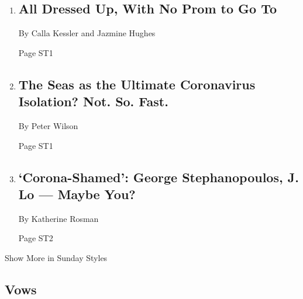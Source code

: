 \begin{enumerate}
\def\labelenumi{\arabic{enumi}.}
\item
  \href{/2020/04/17/style/prom-canceled-coronavirus.html}{}

  \hypertarget{all-dressed-up-with-no-prom-to-go-to-1}{%
  \subsection{All Dressed Up, With No Prom to Go
  To}\label{all-dressed-up-with-no-prom-to-go-to-1}}

  By Calla Kessler and Jazmine Hughes

  Page ST1
\item
  \href{/2020/04/18/style/coronavirus-yachts.html}{}

  \hypertarget{the-seas-as-the-ultimate-coronavirus-isolation-not-so-fast}{%
  \subsection{The Seas as the Ultimate Coronavirus Isolation? Not. So.
  Fast.}\label{the-seas-as-the-ultimate-coronavirus-isolation-not-so-fast}}

  By Peter Wilson

  Page ST1
\item
  \href{/2020/04/16/style/coronavirus-public-shaming.html}{}

  \hypertarget{corona-shamed-george-stephanopoulos-j-lo--maybe-you}{%
  \subsection{`Corona-Shamed': George Stephanopoulos, J. Lo --- Maybe
  You?}\label{corona-shamed-george-stephanopoulos-j-lo--maybe-you}}

  By Katherine Rosman

  Page ST2
\end{enumerate}

Show More in Sunday Styles

\hypertarget{vows}{%
\subsection{Vows}\label{vows}}

